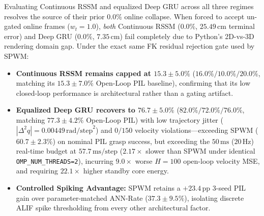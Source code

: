 \documentclass[11pt]{article}
\begin{document}
Evaluating Continuous RSSM and equalized Deep GRU across all three regimes resolves the source of their prior $0.0\%$ online collapse. When forced to accept un-gated online frames ($w_t=1.0$), \emph{both} Continuous RSSM ($0.0\%$, $25.49\,\text{cm}$ terminal error) and Deep GRU ($0.0\%$, $7.35\,\text{cm}$) fail completely due to Python's 2D-vs-3D rendering domain gap. Under the exact same FK residual rejection gate used by SPWM:
\begin{itemize}
    \item \textbf{Continuous RSSM remains capped at $15.3 \pm 5.0\%$} ($16.0\% / 10.0\% / 20.0\%$, matching its $15.3 \pm 7.0\%$ Open-Loop PIL baseline), confirming that its low closed-loop performance is architectural rather than a gating artifact.
    \item \textbf{Equalized Deep GRU recovers to $76.7 \pm 5.0\%$} ($82.0\% / 72.0\% / 76.0\%$, matching $77.3 \pm 4.2\%$ Open-Loop PIL) with low trajectory jitter ($|\Delta^2 q| = 0.00449\,\text{rad/step}^2$) and $0/150$ velocity violations---exceeding SPWM ($60.7 \pm 2.3\%$) on nominal PIL grasp success, but exceeding the $50\,\text{ms}$ ($20\,\text{Hz}$) real-time budget at $57.7\,\text{ms/step}$ ($2.17\times$ slower than SPWM under identical \texttt{OMP\_NUM\_THREADS=2}), incurring $9.0\times$ worse $H=100$ open-loop velocity MSE, and requiring $22.1\times$ higher standby core energy.
    \item \textbf{Controlled Spiking Advantage:} SPWM retains a $+23.4\,\text{pp}$ 3-seed PIL gain over parameter-matched ANN-Rate ($37.3 \pm 9.5\%$), isolating discrete ALIF spike thresholding from every other architectural factor.
\end{itemize}
\end{document}
